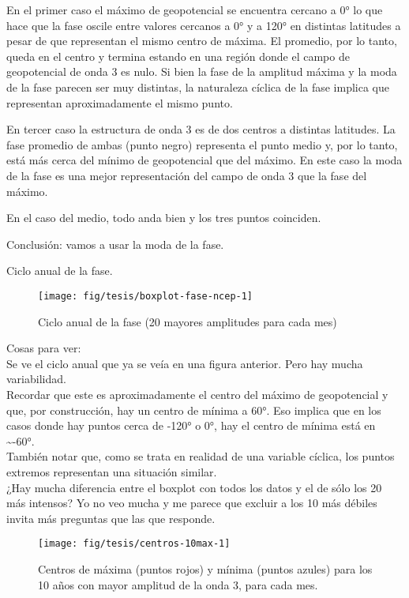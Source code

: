\documentclass[spanish,a4paper]{book}
\begin{document}
En el primer caso el máximo de geopotencial se encuentra cercano a 0° lo
que hace que la fase oscile entre valores cercanos a 0° y a 120° en
distintas latitudes a pesar de que representan el mismo centro de
máxima. El promedio, por lo tanto, queda en el centro y termina estando
en una región donde el campo de geopotencial de onda 3 es nulo. Si bien
la fase de la amplitud máxima y la moda de la fase parecen ser muy
distintas, la naturaleza cíclica de la fase implica que representan
aproximadamente el mismo punto.

En tercer caso la estructura de onda 3 es de dos centros a distintas
latitudes. La fase promedio de ambas (punto negro) representa el punto
medio y, por lo tanto, está más cerca del mínimo de geopotencial que del
máximo. En este caso la moda de la fase es una mejor representación del
campo de onda 3 que la fase del máximo.

En el caso del medio, todo anda bien y los tres puntos coinciden.

Conclusión: vamos a usar la moda de la fase.

Ciclo anual de la fase.

\begin{figure}
\texttt{[image: fig/tesis/boxplot-fase-ncep-1]} \caption{Ciclo anual de la fase (20 mayores amplitudes para cada mes)}\label{fig:boxplot-fase-ncep}
\end{figure}

Cosas para ver:\\
Se ve el ciclo anual que ya se veía en una figura anterior. Pero hay
mucha variabilidad.\\
Recordar que este es aproximadamente el centro del máximo de
geopotencial y que, por construcción, hay un centro de mínima a 60°. Eso
implica que en los casos donde hay puntos cerca de -120° o 0°, hay el
centro de mínima está en \textasciitilde{}-60°.\\
También notar que, como se trata en realidad de una variable cíclica,
los puntos extremos representan una situación similar.\\
¿Hay mucha diferencia entre el boxplot con todos los datos y el de sólo
los 20 más intensos? Yo no veo mucha y me parece que excluir a los 10
más débiles invita más preguntas que las que responde.

\begin{figure}

{\centering \texttt{[image: fig/tesis/centros-10max-1]} 

}

\caption{Centros de máxima (puntos rojos) y mínima (puntos azules) para los 10 años con mayor amplitud de la onda 3, para cada mes.}\label{fig:centros-10max}
\end{figure}
\end{document}
